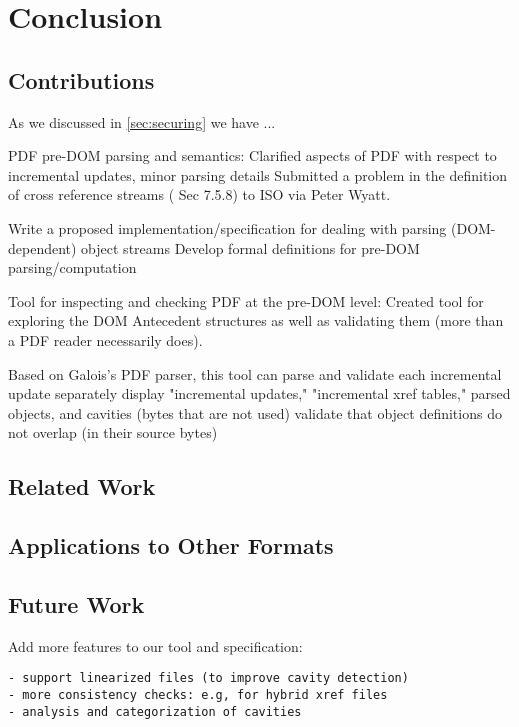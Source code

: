 \section{Conclusion }
\label{sec:conclusion}

\subsection{Contributions}

As we discussed in \cref{sec:securing} we have ...


PDF pre-DOM parsing and semantics:
Clarified aspects of PDF with respect to incremental updates, minor parsing details
Submitted a problem in the definition of cross reference streams
(\cite{isotc171sc2wg8ISO32000220202020} Sec 7.5.8) to
ISO via Peter Wyatt.

Write a proposed implementation/specification for dealing with parsing (DOM-dependent) object streams
Develop formal definitions for pre-DOM parsing/computation

Tool for inspecting and checking PDF at the pre-DOM level:
Created tool for exploring the DOM Antecedent structures as well as validating
them (more than a PDF reader necessarily does).

Based on Galois's  PDF parser, this tool can
parse and validate each incremental update separately
display "incremental updates," "incremental xref tables," parsed objects, and cavities (bytes that are not used)
validate that object definitions do not overlap (in their source bytes)
      
\subsection{Related Work}


\subsection{Applications to Other Formats}


\subsection{Future Work}

Add more features to our tool and specification:
\begin{lstlisting}[style=meta]
- support linearized files (to improve cavity detection)
- more consistency checks: e.g, for hybrid xref files
- analysis and categorization of cavities
\end{lstlisting}